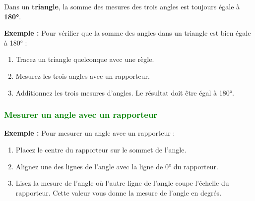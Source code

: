 \documentclass{article}
\begin{document}
\begin{tcolorbox}[colback=red!10!white, colframe=red!75!black, title=\textcolor{white}{Propriété : Somme des angles dans un triangle}, sharp corners=south]
    Dans un \textbf{triangle}, la somme des mesures des trois angles est toujours égale à \textbf{180°}.
\end{tcolorbox}

\vspace{0.2cm}

\begin{tcolorbox}[colback=orange!10!white, colframe=orange!75!black, title=\textcolor{white}{Exemple de vérification}, sharp corners=south]
    \textbf{Exemple :} Pour vérifier que la somme des angles dans un triangle est bien égale à 180° :
    \begin{enumerate}
        \item Tracez un triangle quelconque avec une règle.
        \item Mesurez les trois angles avec un rapporteur.
        \item Additionnez les trois mesures d'angles. Le résultat doit être égal à 180°.
    \end{enumerate}
\end{tcolorbox}

\vspace{0.2cm}

\subsubsection{\textcolor{green}{Mesurer un angle avec un rapporteur}}

\begin{tcolorbox}[colback=orange!10!white, colframe=orange!75!black, title=\textcolor{white}{Exemple de mesure d'angle}, sharp corners=south]
    \textbf{Exemple :} Pour mesurer un angle avec un rapporteur :
    \begin{enumerate}
        \item Placez le centre du rapporteur sur le sommet de l'angle.
        \item Alignez une des lignes de l'angle avec la ligne de 0° du rapporteur.
        \item Lisez la mesure de l'angle où l'autre ligne de l'angle coupe l'échelle du rapporteur. Cette valeur vous donne la mesure de l'angle en degrés.
    \end{enumerate}
\end{tcolorbox}
\end{document}

